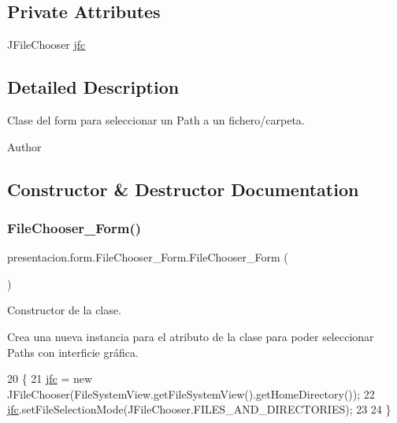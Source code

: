\subsection*{Private Attributes}
\begin{DoxyCompactItemize}
\item 
J\+File\+Chooser \hyperlink{classpresentacion_1_1form_1_1FileChooser__Form_a6fc55a912c266f0379aab09209dd858c}{jfc}
\end{DoxyCompactItemize}


\subsection{Detailed Description}
Clase del form para seleccionar un Path a un fichero/carpeta. 

\begin{DoxyAuthor}{Author}

\end{DoxyAuthor}


\subsection{Constructor \& Destructor Documentation}
\mbox{\label{classpresentacion_1_1form_1_1FileChooser__Form_abcd4d671f55d23cf9e0f2488a80b62cb}} 
\subsubsection{\texorpdfstring{File\+Chooser\+\_\+\+Form()}{FileChooser\_Form()}}
{\footnotesize\ttfamily presentacion.\+form.\+File\+Chooser\+\_\+\+Form.\+File\+Chooser\+\_\+\+Form (\begin{DoxyParamCaption}{ }\end{DoxyParamCaption})\hspace{0.3cm}{\ttfamily [inline]}}



Constructor de la clase. 

Crea una nueva instancia para el atributo de la clase para poder seleccionar Path\textquotesingle{}s con interficie gráfica. 
\begin{DoxyCode}
20                               \{
21         \hyperlink{classpresentacion_1_1form_1_1FileChooser__Form_a6fc55a912c266f0379aab09209dd858c}{jfc} = \textcolor{keyword}{new} JFileChooser(FileSystemView.getFileSystemView().getHomeDirectory());
22         \hyperlink{classpresentacion_1_1form_1_1FileChooser__Form_a6fc55a912c266f0379aab09209dd858c}{jfc}.setFileSelectionMode(JFileChooser.FILES\_AND\_DIRECTORIES);
23 
24     \}
\end{DoxyCode}


